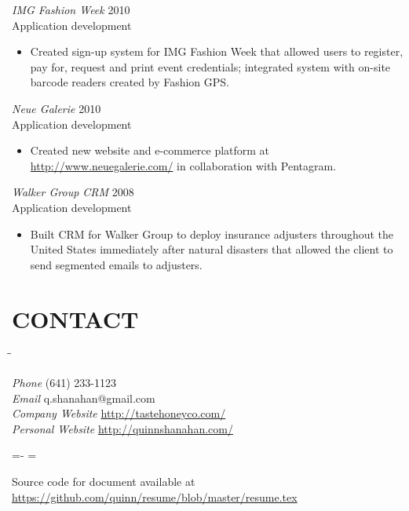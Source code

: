\documentclass[line,margin]{res}
\begin{document}
\begin{resume}
\begin{itemize}
    \end{itemize}

    {\sl IMG Fashion Week}
    \hfill 2010 \\
    Application development
    \begin{itemize} \itemsep -2pt
        \item
            Created sign-up system for IMG Fashion Week that allowed users to
            register, pay for, request and print event credentials; integrated
            system with on-site barcode readers created by Fashion GPS.
    \end{itemize}

    {\sl Neue Galerie}
    \hfill 2010 \\
    Application development
    \begin{itemize} \itemsep -2pt
        \item
            Created new website and e-commerce platform at
            \mbox{\url{http://www.neuegalerie.com/}} in collaboration with
            Pentagram.

    \end{itemize}

    \begin{samepage}
    {\sl Walker Group CRM}
    \hfill 2008 \\
    Application development
    \begin{itemize} \itemsep -2pt
        \item
            Built CRM for Walker Group to deploy insurance adjusters
            throughout the United States immediately after natural disasters
            that allowed the client to send segmented emails to adjusters.

    \end{itemize}
    \end{samepage}

\section{CONTACT}
    \vspace{-2.3ex}
    \begin{tabbing}
    \hspace{1.5in}\= \hspace{2.0in}\= \kill

    {\sl Phone}            \> (641) 233-1123 \\
    {\sl Email}            \> q.shanahan@gmail.com \\
    {\sl Company Website}  \> \url{http://tastehoneyco.com/} \\
    {\sl Personal Website} \> \url{http://quinnshanahan.com/} \\

    \end{tabbing}

\vfill
\leftskip=-\hoffset
\advance\textwidth\hoffset
\hsize=\textwidth
\fullline
\vskip 2pt

Source code for document available at
\url{https://github.com/quinn/resume/blob/master/resume.tex}

\end{resume}
\end{document}
